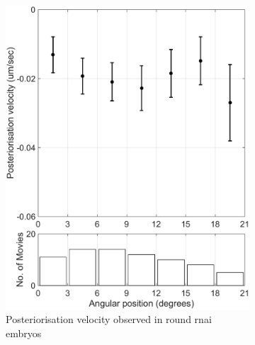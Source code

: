 \begin{figure}
\label{fig:ima3CompareRoundElliptical}
\end{figure}

\begin{figure}
\centering
\begin{subfigure}[t]{0.45\textwidth}
    \centering
    \includegraphics[width=\textwidth]{Results/FigIma3RoundElliptical/imaRound.pdf}
    \caption{Posteriorisation velocity observed in round  \ac{rnai} embryos} 
    \label{subfig:ima3aspRatioSplitPostVel-round}
\end{subfigure}
\hfill
\begin{subfigure}[t]{0.45\textwidth}
    \centering

\end{subfigure}
\end{figure}
